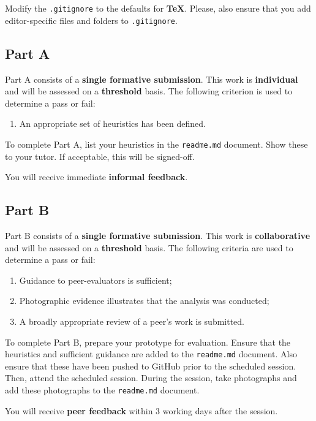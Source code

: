 \documentclass{../fal_assignment}
\begin{document}
Modify the \texttt{.gitignore} to the defaults for \textbf{TeX}. Please, also ensure that you add editor-specific files and folders to \texttt{.gitignore}. 

\subsection*{Part A}

Part A consists of a \textbf{single formative submission}. This work is \textbf{individual} and will be assessed on a \textbf{threshold} basis. The following criterion is used to determine a pass or fail:

\begin{enumerate}[label=(\alph*)]
	\item An appropriate set of heuristics has been defined.
\end{enumerate}

To complete Part A, list your heuristics in the \texttt{readme.md} document.  Show these to your tutor.  If acceptable, this will be signed-off. 

You will receive immediate \textbf{informal feedback}.

\subsection*{Part B}

Part B consists of a \textbf{single formative submission}. This work is \textbf{collaborative} and will be assessed on a \textbf{threshold} basis. The following criteria are used to determine a pass or fail:

\begin{enumerate}[label=(\alph*)]
	\item Guidance to peer-evaluators is sufficient;
	\item Photographic evidence illustrates that the analysis was conducted;
	\item A broadly appropriate review of a peer's work is submitted.
\end{enumerate}

To complete Part B, prepare your prototype for evaluation. Ensure that the heuristics and sufficient guidance are added to the \texttt{readme.md} document. Also ensure that these have been pushed to GitHub prior to the scheduled session. Then, attend the scheduled session. During the session, take photographs and add these photographs to the \texttt{readme.md} document.

You will receive \textbf{peer feedback} within 3 working days after the session.
\end{document}
